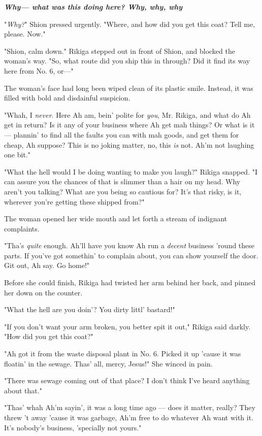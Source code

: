 \textbf{\emph{Why--- what was this doing here? Why, why, why\el }}

"\emph{Why?}" Shion pressed urgently. "Where, and how did you get this coat?
Tell me, please. Now."

"Shion, calm down." Rikiga stepped out in front of Shion, and blocked
the woman's way. "So, what route did you ship this in through? Did it
find its way here from No. 6, or---"

The woman's face had long been wiped clean of its plastic smile.
Instead, it was filled with bold and disdainful suspicion.

"Whah, I \emph{never}. Here Ah am, bein' polite for \emph{you}, Mr. Rikiga, and what
do Ah get in return? Is it any of your business where Ah get mah things?
Or what is it--- plannin' to find all the faults you can with mah goods,
and get them for cheap, Ah suppose? This is no joking matter, no, this
\emph{is} not. Ah'm not laughing one bit."

"What the hell would I be doing wanting to make you laugh?" Rikiga
snapped. "I can assure you the chances of that is slimmer than a hair on
my head. Why aren't you talking? What are you being so cautious for?
It's that risky, is it, wherever you're getting these shipped from?"

The woman opened her wide mouth and let forth a stream of indignant
complaints.

"Tha's \emph{quite} enough. Ah'll have you know Ah run a \emph{decent} business 'round
these parts. If you've got somethin' to complain about, you can show
yourself the door. Git out, Ah say. Go home!"

Before she could finish, Rikiga had twisted her arm behind her back, and
pinned her down on the counter.

"What the hell are you doin'? You dirty littl' bastard!"

"If you don't want your arm broken, you better spit it out," Rikiga said
darkly. "How did you get this coat?"

"Ah got it from the waste disposal plant in No. 6. Picked it up 'cause
it was floatin' in the sewage. Thas' all, mercy, Jesus!" She winced in
pain.

"There was sewage coming out of that place? I don't think I've heard
anything about that."

"Thas' whah Ah'm sayin', it was a long time ago --- does it matter,
really? They threw 't away 'cause it was garbage, Ah'm free to do
whatever Ah want with it. It's nobody's business, 'specially not yours."

